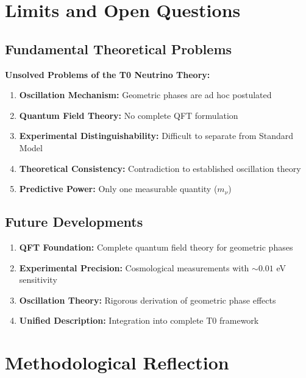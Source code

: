 \documentclass[12pt,a4paper]{article}
\begin{document}
	\section{Limits and Open Questions}
	
	\subsection{Fundamental Theoretical Problems}
	
	\begin{warning}
		\textbf{Unsolved Problems of the T0 Neutrino Theory:}
		
		\begin{enumerate}
			\item \textbf{Oscillation Mechanism:} Geometric phases are ad hoc postulated
			\item \textbf{Quantum Field Theory:} No complete QFT formulation
			\item \textbf{Experimental Distinguishability:} Difficult to separate from Standard Model
			\item \textbf{Theoretical Consistency:} Contradiction to established oscillation theory
			\item \textbf{Predictive Power:} Only one measurable quantity ($m_\nu$)
		\end{enumerate}
	\end{warning}
	
	\subsection{Future Developments}
	
	\begin{enumerate}
		\item \textbf{QFT Foundation:} Complete quantum field theory for geometric phases
		\item \textbf{Experimental Precision:} Cosmological measurements with $\sim 0.01$ eV sensitivity
		\item \textbf{Oscillation Theory:} Rigorous derivation of geometric phase effects
		\item \textbf{Unified Description:} Integration into complete T0 framework
	\end{enumerate}
	
	\section{Methodological Reflection}
	
\end{document}
